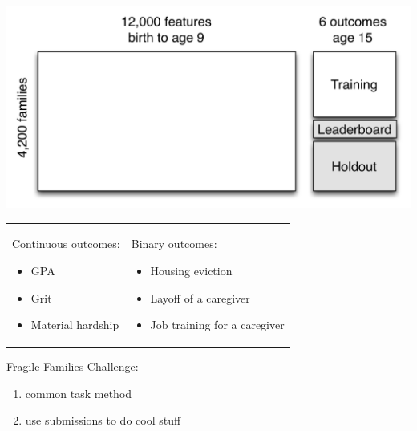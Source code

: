 \documentclass{beamer}
\begin{document}
\begin{frame}

\begin{center}
\includegraphics[width=\textwidth]{figures/ffc_design_matrix_ml}
\end{center}

\end{frame}
\begin{frame}

\begin{tabular}{p{}p{}}
Continuous outcomes:
\begin{itemize}
\item GPA
\item Grit
\item Material hardship
\end{itemize}
&
Binary outcomes:
\begin{itemize}
\item Housing eviction
\item Layoff of a caregiver
\item Job training for a caregiver
\end{itemize}
\end{tabular}

\end{frame}
\begin{frame}

Fragile Families Challenge:
\begin{enumerate}
\item common task method
\pause
\item use submissions to do cool stuff
\end{enumerate}

\end{frame}
\end{document}
